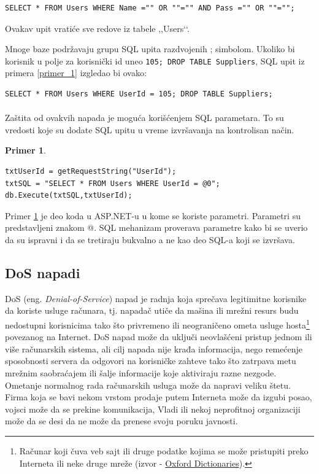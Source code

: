 \documentclass[a4paper]{article}
\theoremstyle{break}
\newtheorem{primer}{Primer}[section]
\begin{document}
{\begin{lstlisting}[frame=single]
SELECT * FROM Users WHERE Name ="" OR ""="" AND Pass ="" OR ""="";
\end{lstlisting}
\noindent Ovakav upit vratiće sve redove iz tabele ,,Users‘‘. 

Mnoge baze podržavaju grupu SQL upita razdvojenih ; simbolom. Ukoliko bi korisnik u polje za korisnički id uneo \texttt{105; DROP TABLE Suppliers}, SQL upit iz primera \ref{primer_1} izgledao bi ovako:

\begin{lstlisting}[frame=single]
SELECT * FROM Users WHERE UserId = 105; DROP TABLE Suppliers; 
\end{lstlisting}
\paragraph{}
Zaštita od ovakvih napada je moguća korišćenjem SQL parametara. To su vredosti koje su dodate SQL upitu u vreme izvršavanja na kontrolisan način.

\begin{primer}
\label{primer_3}
\begin{lstlisting}[frame=single]
txtUserId = getRequestString("UserId");
txtSQL = "SELECT * FROM Users WHERE UserId = @0";
db.Execute(txtSQL,txtUserId);
\end{lstlisting}
\end{primer}
\noindent Primer \ref{primer_3} je deo koda u ASP.NET-u u kome se koriste parametri. Parametri su predstavljeni znakom @. SQL mehanizam proverava parametre kako bi se uverio da su ispravni i da se tretiraju bukvalno a ne kao deo SQL-a koji se izvršava.

\subsection{DoS napadi}
\label{subsec:DoS}

DoS (eng. {\em Denial-of-Service}) napad je radnja koja sprečava legitimitne korisnike da koriste usluge računara, tj. napadač utiče da mašina ili mrežni resurs  budu nedostupni korisnicima tako što privremeno ili neograničeno ometa usluge hosta\footnote{Računar koji čuva veb sajt ili druge podatke kojima se može pristupiti preko Interneta ili neke druge mreže (izvor - \href{https://en.oxforddictionaries.com/definition/host}{Oxford Dictionaries}).} povezanog na Internet. DoS napad može da uključi neovlašćeni pristup jednom ili više računarskih sistema, ali cilj napada nije krađa informacija, nego remećenje sposobnosti servera da odgovori na korisničke zahteve tako što zatrpava metu mrežnim saobraćajem ili šalje informacije koje aktiviraju razne nezgode. Ometanje normalnog rada računarskih usluga može da napravi veliku štetu. Firma koja se bavi nekom vrstom prodaje putem Interneta može da izgubi posao, vojsci može da se prekine komunikacija, Vladi ili nekoj neprofitnoj organizaciji može da se desi da ne može da prenese svoju poruku javnosti.

}
\end{document}
